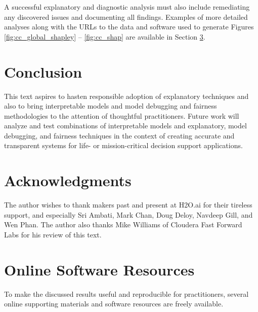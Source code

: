 \documentclass[sigconf]{acmart}
\begin{document}
\noindent A successful explanatory and diagnostic analysis must also include remediating any discovered issues and documenting all findings. Examples of more detailed analyses along with the URLs to the data and software used to generate Figures \ref{fig:cc_global_shapley} -- \ref{fig:cc_shap} are available in Section \ref{sec:software}.


\section{Conclusion}

This text aspires to hasten responsible adoption of explanatory techniques and also to bring interpretable models and model debugging and fairness methodologies to the attention of thoughtful practitioners. Future work will analyze and test combinations of interpretable models and explanatory, model debugging, and fairness techniques in the context of creating accurate and transparent systems for life- or mission-critical decision support applications. 

\section{Acknowledgments}

The author wishes to thank makers past and present at H2O.ai for their tireless support, and especially Sri Ambati, Mark Chan, Doug Deloy, Navdeep Gill, and Wen Phan. The author also thanks Mike Williams of Cloudera Fast Forward Labs for his review of this text.  




% 
\appendix
\onecolumn
\section{Online Software Resources} \label{sec:software}

To make the discussed results useful and reproducible for practitioners, several online supporting materials and software resources are freely available.\\
\end{document}
